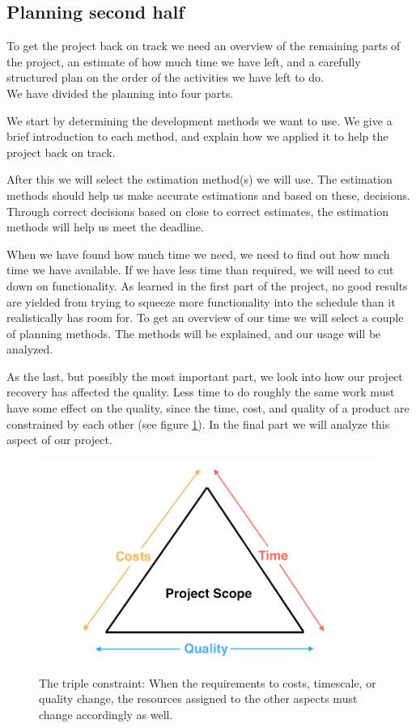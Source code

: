 \subsection{Planning second half}
To get the project back on track we need an overview of the remaining parts of the project, an estimate of how much time we have left, and a carefully structured plan on the order of the activities we have left to do.\\
We have divided the planning into four parts.

We start by determining the development methods we want to use. We give a brief introduction to each method, and explain how we applied it to help the project back on track.

After this we will select the estimation method(s) we will use. The estimation methods should help us make accurate estimations and based on these, decisions. Through correct decisions based on close to correct estimates, the estimation methods will help us meet the deadline.

When we have found how much time we need, we need to find out how much time we have available. If we have less time than required, we will need to cut down on functionality. As learned in the first part of the project, no good results are yielded from trying to squeeze more functionality into the schedule than it realistically has room for.
To get an overview of our time we will select a couple of planning methods. The methods will be explained, and our usage will be analyzed.

As the last, but possibly the most important part, we look into how our project recovery has affected the quality. Less time to do roughly the same work must have some effect on the quality, since the time, cost, and quality of a product are constrained by each other (see figure \ref{fig:timeCostsQuality})\cite[p. 191]{PM}. In the final part we will analyze this aspect of our project.

\begin{figure}[t]
  \includegraphics[width=\textwidth]{illustrations/timeCostsQuality}
  \caption{The triple constraint: When the requirements to costs, timescale, or quality change, the resources assigned to the other aspects must change accordingly as well.}
  \label{fig:timeCostsQuality}
\end{figure}
